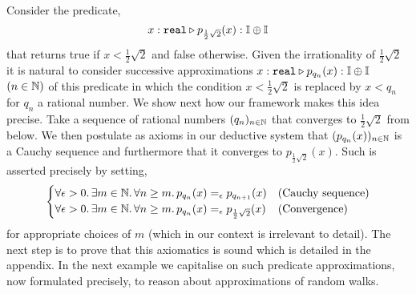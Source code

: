 \documentclass[a4paper,UKenglish,cleveref, autoref, thm-restate]{lipics-v2021}
\begin{document}
\begin{example}
        Consider the predicate,
        \[
                x : \mathtt{real} \triangleright
                p_{\frac{1}{2}\sqrt{2}}(x) : \mathbb{I} \oplus \mathbb{I}
        \]
        that returns true if $x < \frac{1}{2}\sqrt{2}$ and false otherwise.
        Given the irrationality of $\frac{1}{2}\sqrt{2}$ it is natural to
        consider successive approximations $x : \mathtt{real}\triangleright p_{q_n}(x)
        :  \mathbb{I} \oplus \mathbb{I}$ $(n \in \mathbb{N})$ of this predicate in which the
        condition $x < \frac{1}{2}{\sqrt{2}}$ is replaced by $x < q_n$ for
        $q_n$ a rational number. We show next how our framework makes this idea
        precise. Take a sequence of rational numbers $(q_n)_{n \in \mathbb{N}}$ that
        converges to $\frac{1}{2}\sqrt{2}$ from below. We then postulate as
        axioms in our deductive system that $(p_{q_n}(x))_{n \in \mathbb{N}}$ is a
        Cauchy sequence and furthermore that it converges to $p_{\frac{1}{2}
        \sqrt{2}}(x)$.  Such is asserted precisely by setting,
        \begin{equation}
                \label{eq:sound}
                \begin{cases}
                \forall \epsilon > 0. \, \exists m \in \mathbb{N}.
                \, \forall n \geq m. \, p_{q_n}(x) =_\epsilon p_{q_{n+1}} (x)
                & \text{(Cauchy sequence)}
                \\
                \forall \epsilon > 0. \, \exists m \in \mathbb{N}.
                \, \forall n \geq m. \, p_{q_n}(x) 
                =_\epsilon p_{\frac{1}{2} \sqrt{2}} (x)
                & \text{(Convergence)}
                \end{cases}
        \end{equation}
        for appropriate choices of $m$ (which in our context is irrelevant to
        detail). The next step is to prove that this axiomatics is sound which
        is detailed in the appendix. In the next example we capitalise on such
        predicate approximations, now formulated precisely, to reason about
        approximations of random walks.
        \end{example}
\end{document}
